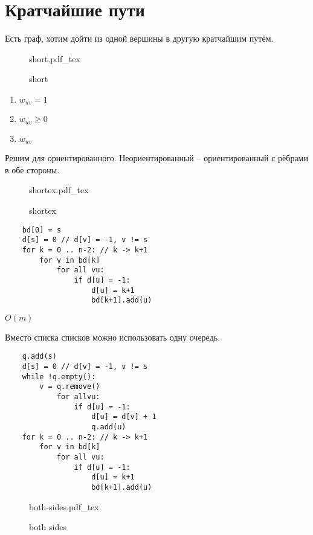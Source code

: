 \documentclass{book}
\theoremstyle{definition}
\newcommand{\incfig}[1]{%
    \def\svgwidth{\columnwidth}
    {#1.pdf_tex}
}
\begin{document}
\section{Кратчайшие пути}

Есть граф, хотим дойти из одной вершины в другую кратчайшим путём.

\begin{figure}[!ht]
    \centering
    \incfig{short}
    \caption{short}
    \label{fig:short}
\end{figure}

\begin{enumerate}
    \item $w_{uv} = 1$
    \item  $w_{uv} \geqslant 0$
    \item $w_{uv}$
\end{enumerate}

Решим для ориентированного. Неориентированный -- ориентированный с рёбрами в обе стороны.

\begin{figure}[!ht]
    \centering
    \incfig{shortex}
    \caption{shortex}
    \label{fig:shortex}
\end{figure}

\begin{lstlisting}
    bd[0] = s
    d[s] = 0 // d[v] = -1, v != s
    for k = 0 .. n-2: // k -> k+1
        for v in bd[k]
            for all vu:
                if d[u] = -1:
                    d[u] = k+1
                    bd[k+1].add(u)
\end{lstlisting}

$O\left( m \right) $ 

Вместо списка списков можно использовать одну очередь.

\begin{lstlisting}
    q.add(s)
    d[s] = 0 // d[v] = -1, v != s
    while !q.empty():
        v = q.remove()
            for allvu:
                if d[u] = -1:
                    d[u] = d[v] + 1
                    q.add(u)
    for k = 0 .. n-2: // k -> k+1
        for v in bd[k]
            for all vu:
                if d[u] = -1:
                    d[u] = k+1
                    bd[k+1].add(u)
\end{lstlisting}


\begin{figure}[!ht]
    \centering
    \incfig{both-sides}
    \caption{both sides}
    \label{fig:both-sides}
\end{figure}
\end{document}
